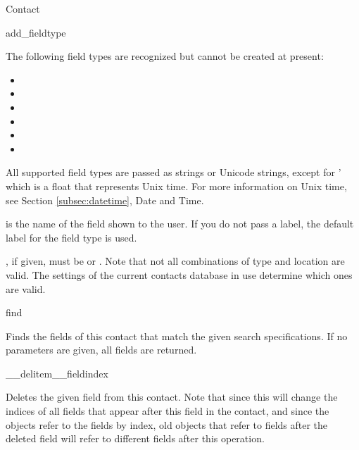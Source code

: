 \begin{classdesc*}{Contact}
\begin{methoddesc}[Contact]{add_field}{type }
\begin{itemize}
\end{itemize}

The following field types are recognized but cannot be created at present:

\begin{itemize}
\item {}
\item {}
\item {}
\item {}
\item {}
\item {}
\end{itemize}



All supported field types are passed as strings or Unicode strings, except for 
' which is a float that represents Unix time. For more information 
on Unix time, see Section \ref{subsec:datetime}, Date and Time.

 is the name of the field shown to the user. If you 
do not pass a label, the default label for the field type is used.

, if given, must be  or 
. Note that not all combinations of type and location are 
valid. The settings of the current contacts database in use determine which 
ones are valid. 

\end{methoddesc}

\begin{methoddesc}[Contact]{find}{}

Finds the fields of this contact that match the given search specifications. 
If no parameters are given, all fields are returned.

\end{methoddesc}

\begin{methoddesc}[Contact]{__delitem__}{fieldindex}

Deletes the given field from this contact. Note that since this will change 
the indices of all fields that appear after this field in the contact, and 
since the  objects refer to the fields by index, old 
objects that refer to fields after the deleted field 
will refer to different fields after this operation.

\end{methoddesc}

\end{classdesc*}

